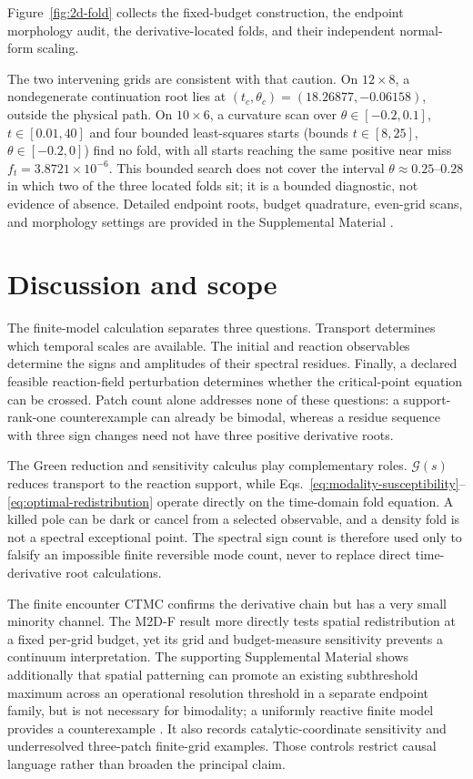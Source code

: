 \documentclass[aps,pre,reprint,amsmath,amssymb,longbibliography,floatfix]{revtex4-2}
\newcommand{\Gres}{\mathcal G}
\begin{document}
Figure~\ref{fig:2d-fold} collects the fixed-budget construction, the
endpoint morphology audit, the derivative-located folds, and their independent
normal-form scaling.

The two intervening grids are consistent with that caution. On
\(12\times8\), a nondegenerate continuation root lies at
\((t_c,\theta_c)=(18.26877,-0.06158)\), outside the physical path. On
\(10\times6\), a curvature scan over \(\theta\in[-0.2,0.1]\),
\(t\in[0.01,40]\) and four bounded least-squares starts (bounds
\(t\in[8,25]\), \(\theta\in[-0.2,0]\))
find no fold, with all starts reaching the same positive near miss
\(f_t=3.8721\times10^{-6}\). This bounded search does not cover the
interval \(\theta\approx0.25\)--\(0.28\) in which two of the three located
folds sit; it is a bounded diagnostic, not evidence of absence. Detailed endpoint roots, budget
quadrature, even-grid scans, and morphology settings are provided in the
Supplemental Material \cite{supplementalMaterial}.

\section{Discussion and scope}
\label{sec:discussion}

The finite-model calculation separates three questions. Transport determines
which temporal scales are available. The initial and reaction observables
determine the signs and amplitudes of their spectral residues. Finally, a
declared feasible reaction-field perturbation determines whether the
critical-point equation can be crossed. Patch count alone addresses none of
these questions: a support-rank-one counterexample can already be bimodal,
whereas a residue sequence with three sign changes need not have three
positive derivative roots.

The Green reduction and sensitivity calculus play complementary roles.
\(\Gres(s)\) reduces transport to the reaction support, while
Eqs.~\eqref{eq:modality-susceptibility}--\eqref{eq:optimal-redistribution}
operate directly on the time-domain fold equation. A killed pole can be dark
or cancel from a selected observable, and a density fold is not a spectral
exceptional point. The spectral sign count is therefore used only to
falsify an impossible finite reversible mode count, never to replace direct
time-derivative root calculations.

The finite encounter CTMC confirms the derivative chain but has a very small
minority channel. The M2D-F result more directly tests spatial redistribution
at a fixed per-grid budget, yet its grid and budget-measure sensitivity
prevents a continuum interpretation. The supporting Supplemental Material
shows additionally that spatial patterning can promote an existing
subthreshold maximum across an operational resolution threshold in a separate
endpoint family, but is not necessary for bimodality; a uniformly reactive
finite model provides a counterexample \cite{supplementalMaterial}. It also
records catalytic-coordinate sensitivity and underresolved three-patch
finite-grid examples. Those controls restrict causal language rather than
broaden the principal claim.
\end{document}
